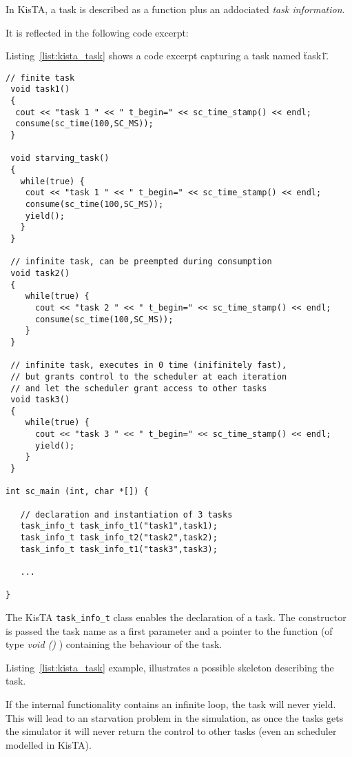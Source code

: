 In KisTA, a task is described as a function plus an addociated \emph{task information}.

It is reflected in the following code excerpt:

Listing~\ref{list:kista_task} shows a code excerpt capturing a task named \"task1\".

\begin{lstlisting}[style=KistaCodeStyle,caption={Declaration and description of a task in KisTA under it C++ API front-emd.},label=list:kista_task]
 // finite task
 void task1()
 {			
  cout << "task 1 " << " t_begin=" << sc_time_stamp() << endl;
  consume(sc_time(100,SC_MS));	
 }
     
 void starving_task()
 {
   while(true) {		
	cout << "task 1 " << " t_begin=" << sc_time_stamp() << endl;
	consume(sc_time(100,SC_MS));
    yield();
   }		
 }  

 // infinite task, can be preempted during consumption
 void task2()
 {
    while(true) {		
	  cout << "task 2 " << " t_begin=" << sc_time_stamp() << endl;
	  consume(sc_time(100,SC_MS));
	}		
 } 
     
 // infinite task, executes in 0 time (inifinitely fast),
 // but grants control to the scheduler at each iteration
 // and let the scheduler grant access to other tasks
 void task3()
 {
    while(true) {		
	  cout << "task 3 " << " t_begin=" << sc_time_stamp() << endl;
      yield();
	}		
 }            

int sc_main (int, char *[]) {
   
   // declaration and instantiation of 3 tasks
   task_info_t task_info_t1("task1",task1);
   task_info_t task_info_t2("task2",task2);
   task_info_t task_info_t1("task3",task3);

   ...
    
}

\end{lstlisting}

The KisTA \texttt{task\_info\_t} class enables the declaration of a task.
The constructor is passed the task name as a first parameter and 
a pointer to the function (of type \emph{void ()} ) containing the
behaviour of the task.

Listing~\ref{list:kista_task} example, illustrates a possible 
skeleton describing the task.

If the internal functionality contains an infinite loop, the task
will never yield. 
This will lead to an starvation problem in the simulation, as once
the tasks gets the simulator it will never return the control to other tasks
(even an scheduler modelled in KisTA).

